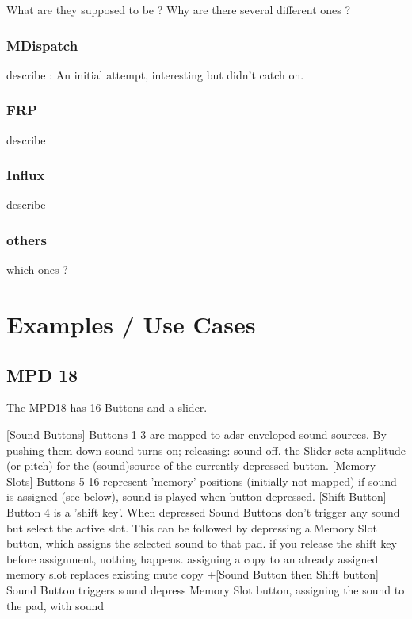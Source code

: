 \documentclass{article}
\begin{document}
What are they supposed to be ? Why are there several different ones ?	
	
\subsubsection{MDispatch}	

describe : An initial attempt, interesting but didn't catch on.
		
\subsubsection{FRP}

describe

\subsubsection{Influx}

describe

\subsubsection{others}

which ones ?

\section{Examples / Use Cases}
\label{sec:examples_use_cases}


\subsection{MPD 18}
\label{sub:mpd_18}

The MPD18 has 16 Buttons and a slider.

    [Sound Buttons] Buttons 1-3 are mapped to adsr enveloped sound sources.
        By pushing them down sound turns on; releasing: sound off.
    the Slider sets amplitude (or pitch) for the (sound)source of the currently depressed button.
    [Memory Slots] Buttons 5-16 represent 'memory' positions (initially not mapped)
        if sound is assigned (see below), sound is played when button depressed.
    [Shift Button] Button 4 is a 'shift key'. When depressed
        Sound Buttons don't trigger any sound but select the active slot. This can be followed by
        depressing a Memory Slot button, which assigns the selected sound to that pad.
        if you release the shift key before assignment, nothing happens.
        assigning a copy to an already assigned memory slot replaces existing
        mute copy +[Sound Button then Shift button]
        Sound Button triggers sound
        depress Memory Slot button, assigning the sound to the pad, with sound
\end{document}
